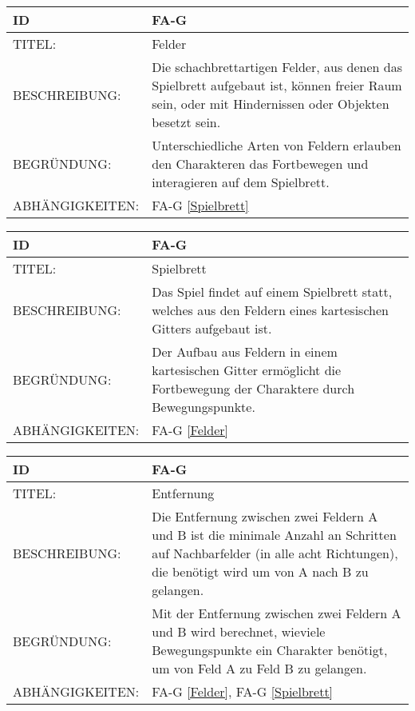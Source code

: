 


\begin{tabularx}{16cm}{l|X}
	{table}\label{Felder}
	\textbf{ID} & \textbf{FA-G \arabic{table}} \\
	\hline
	TITEL: & Felder \\
	\hline
	BESCHREIBUNG: & Die schachbrettartigen Felder, aus denen das Spielbrett aufgebaut ist, können freier Raum sein, oder mit Hindernissen oder Objekten besetzt sein. \\
	\hline
	BEGRÜNDUNG: & Unterschiedliche Arten von Feldern erlauben den Charakteren das Fortbewegen und interagieren auf dem Spielbrett. \\
	\hline
	ABHÄNGIGKEITEN: & FA-G \ref{Spielbrett} \\
\end{tabularx}

\begin{tabularx}{16cm}{l|X}
	{table}\label{Spielbrett}
	\textbf{ID} & \textbf{FA-G \arabic{table}} \\
	\hline
	TITEL: & Spielbrett \\
	\hline
	BESCHREIBUNG: & Das Spiel findet auf einem Spielbrett statt, welches aus den Feldern eines kartesischen Gitters aufgebaut ist. \\
	\hline
	BEGRÜNDUNG: & Der Aufbau aus Feldern in einem kartesischen Gitter ermöglicht die Fortbewegung der Charaktere durch Bewegungspunkte. \\
	\hline
	ABHÄNGIGKEITEN: & FA-G \ref{Felder} \\
\end{tabularx}

\begin{tabularx}{16cm}{l|X}
	{table}\label{Entfernung}
	\textbf{ID} & \textbf{FA-G \arabic{table}} \\
	\hline
	TITEL: & Entfernung \\
	\hline
	BESCHREIBUNG: & Die Entfernung zwischen zwei Feldern A und B ist die minimale Anzahl an Schritten auf Nachbarfelder (in alle acht Richtungen), die benötigt wird um von A nach B zu gelangen. \\
	\hline
	BEGRÜNDUNG: & Mit der Entfernung zwischen zwei Feldern A und B wird berechnet, wieviele Bewegungspunkte ein Charakter benötigt, um von Feld A zu Feld B zu gelangen. \\
	\hline
	ABHÄNGIGKEITEN: & FA-G \ref{Felder}, FA-G \ref{Spielbrett} \\
\end{tabularx}

